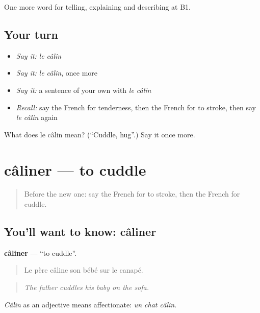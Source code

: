\begin{grammarlens}[title={What you've built}]
One more word for telling, explaining and describing at B1.
\end{grammarlens}

\subsection*{Your turn}
\begin{itemize}
\raggedright
  \item \emph{Say it:} \emph{le câlin}
  \item \emph{Say it:} \emph{le câlin}, once more
  \item \emph{Say it:} a sentence of your own with \emph{le câlin}
  \item \emph{Recall:} say the French for tenderness, then the French for to stroke, then say \emph{le câlin} again
\end{itemize}

\begin{tcolorbox}[breakable,colback=teal!4,colframe=teal!35!black,title={Before you move on}]
What does le câlin mean? (\textquotedblleft{}Cuddle, hug\textquotedblright{}.) Say it once more.
\end{tcolorbox}
\section[câliner]{câliner — to cuddle}

\label{lesson:FR-C488-caliner}



\begin{quote}
Before the new one: say the French for to stroke, then the French for cuddle.
\end{quote}

\subsection*{You'll want to know: câliner}
\textbf{câliner} — \textquotedblleft{}to cuddle\textquotedblright{}.

\begin{quote}
Le père câline son bébé sur le canapé.
\end{quote}

\begin{quote}
\emph{The father cuddles his baby on the sofa.}
\end{quote}

\emph{Câlin} as an adjective means affectionate: \emph{un chat câlin}.

